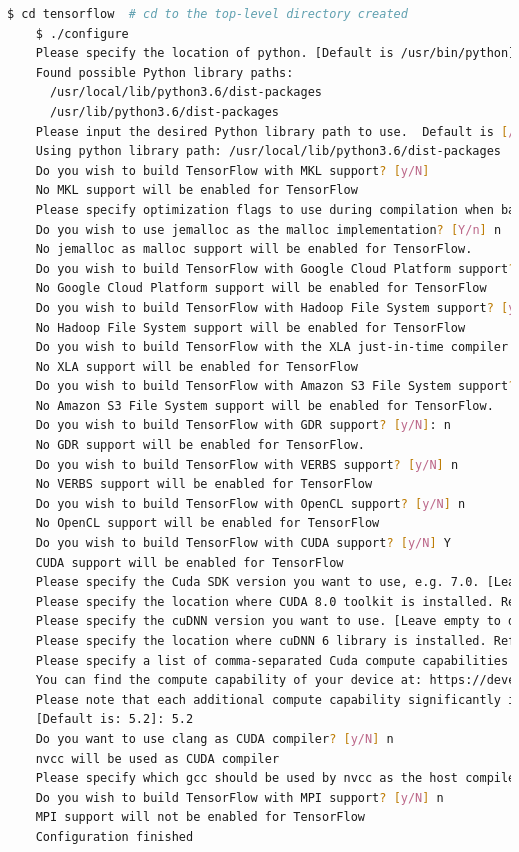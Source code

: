\begin{lstlisting}[caption=Configure bazel for Tensorflow, label=list:configure_bazel, language=bash]
	$ cd tensorflow  # cd to the top-level directory created
	$ ./configure
	Please specify the location of python. [Default is /usr/bin/python]: /usr/bin/python3.6
	Found possible Python library paths:
	  /usr/local/lib/python3.6/dist-packages
	  /usr/lib/python3.6/dist-packages
	Please input the desired Python library path to use.  Default is [/usr/lib/python3.6/dist-packages]
	Using python library path: /usr/local/lib/python3.6/dist-packages
	Do you wish to build TensorFlow with MKL support? [y/N]
	No MKL support will be enabled for TensorFlow
	Please specify optimization flags to use during compilation when bazel option "--config=opt" is specified [Default is -march=native]:
	Do you wish to use jemalloc as the malloc implementation? [Y/n] n
	No jemalloc as malloc support will be enabled for TensorFlow.
	Do you wish to build TensorFlow with Google Cloud Platform support? [y/N] n
	No Google Cloud Platform support will be enabled for TensorFlow
	Do you wish to build TensorFlow with Hadoop File System support? [y/N] n
	No Hadoop File System support will be enabled for TensorFlow
	Do you wish to build TensorFlow with the XLA just-in-time compiler (experimental)? [y/N] n
	No XLA support will be enabled for TensorFlow
	Do you wish to build TensorFlow with Amazon S3 File System support? [Y/n]: n
	No Amazon S3 File System support will be enabled for TensorFlow.
	Do you wish to build TensorFlow with GDR support? [y/N]: n
	No GDR support will be enabled for TensorFlow.
	Do you wish to build TensorFlow with VERBS support? [y/N] n
	No VERBS support will be enabled for TensorFlow
	Do you wish to build TensorFlow with OpenCL support? [y/N] n
	No OpenCL support will be enabled for TensorFlow
	Do you wish to build TensorFlow with CUDA support? [y/N] Y
	CUDA support will be enabled for TensorFlow
	Please specify the Cuda SDK version you want to use, e.g. 7.0. [Leave empty to default to CUDA 8.0]: 8.0
	Please specify the location where CUDA 8.0 toolkit is installed. Refer to README.md for more details. [Default is /usr/local/cuda]:
	Please specify the cuDNN version you want to use. [Leave empty to default to cuDNN 6.0]: 6
	Please specify the location where cuDNN 6 library is installed. Refer to README.md for more details. [Default is /usr/local/cuda]:
	Please specify a list of comma-separated Cuda compute capabilities you want to build with.
	You can find the compute capability of your device at: https://developer.nvidia.com/cuda-gpus.
	Please note that each additional compute capability significantly increases your build time and binary size.
	[Default is: 5.2]: 5.2
	Do you want to use clang as CUDA compiler? [y/N] n
	nvcc will be used as CUDA compiler
	Please specify which gcc should be used by nvcc as the host compiler. [Default is /usr/bin/gcc]:
	Do you wish to build TensorFlow with MPI support? [y/N] n
	MPI support will not be enabled for TensorFlow
	Configuration finished
\end{lstlisting}

